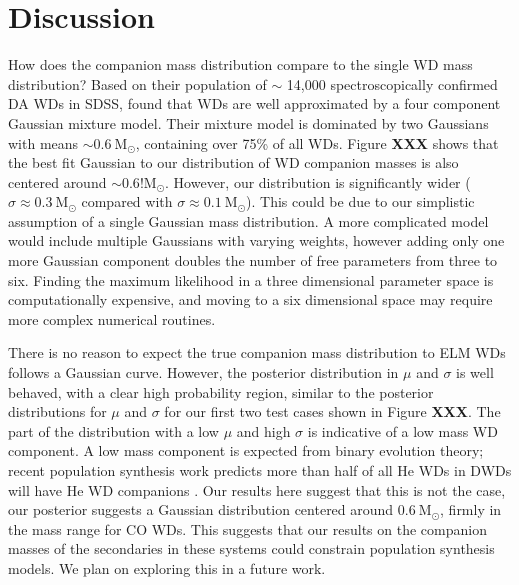 \documentclass[letterpaper,12pt,preprint]{aastex}
\newcommand{\Msun}{\mathrm{M}_\odot}
\begin{document}
\section{Discussion}

How does the companion mass distribution compare to the single WD mass distribution? Based on their population of $\sim$ 14,000 spectroscopically confirmed DA WDs in SDSS, \citet{kleinman13} found that WDs are well approximated by a four component Gaussian mixture model. Their mixture model is dominated by two Gaussians with means $\sim0.6~\Msun$, containing over 75\% of all WDs. Figure {\bf XXX} shows that the best fit Gaussian to our distribution of WD companion masses is also centered around $\sim0.6!\Msun$. However, our distribution is significantly wider ($\sigma \approx 0.3~\Msun$ compared with $\sigma \approx 0.1~\Msun$). This could be due to our simplistic assumption of a single Gaussian mass distribution. A more complicated model would include multiple Gaussians with varying weights, however adding only one more Gaussian component doubles the number of free parameters from three to six. Finding the maximum likelihood in a three dimensional parameter space is computationally expensive, and moving to a six dimensional space may require more complex numerical routines. 


There is no reason to expect the true companion mass distribution to ELM WDs follows a Gaussian curve. However, the posterior distribution in $\mu$ and $\sigma$ is well behaved, with a clear high probability region, similar to the posterior distributions for $\mu$ and $\sigma$ for our first two test cases shown in Figure {\bf XXX}. The part of the distribution with a low $\mu$ and high $\sigma$ is indicative of a low mass WD component. A low mass component is expected from binary evolution theory; recent population synthesis work predicts more than half of all He WDs in DWDs will have He WD companions \citet{toonen12}. Our results here suggest that this is not the case, our posterior suggests a Gaussian distribution centered around $0.6~\Msun$, firmly in the mass range for CO WDs. This suggests that our results on the companion masses of the secondaries in these systems could constrain population synthesis models. We plan on exploring this in a future work.
\end{document}
